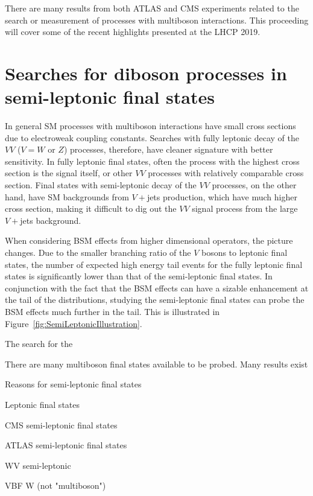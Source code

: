 \documentclass[10pt]{article}
\begin{document}
There are many results from both ATLAS and CMS experiments related to the search or measurement of processes with multiboson interactions.
This proceeding will cover some of the recent highlights presented at the LHCP 2019.

\section{Searches for diboson processes in semi-leptonic final states}

In general SM processes with multiboson interactions have small cross sections due to electroweak coupling constants.
Searches with fully leptonic decay of the $VV$ ($V=W$ or $Z$) processes, therefore, have cleaner signature with better sensitivity.
In fully leptonic final states, often the process with the highest cross section is the signal itself, or other $VV$ processes with relatively comparable cross section.
Final states with semi-leptonic decay of the $VV$ processes, on the other hand, have SM backgrounds from $V+$jets production, which have much higher cross section, making it difficult to dig out the $VV$ signal process from the large $V+$jets background.

When considering BSM effects from higher dimensional operators, the picture changes.
Due to the smaller branching ratio of the $V$ bosons to leptonic final states, the number of expected high energy tail events for the fully leptonic final states is significantly lower than that of the semi-leptonic final states.
In conjunction with the fact that the BSM effects can have a sizable enhancement at the tail of the distributions, studying the semi-leptonic final states can probe the BSM effects much further in the tail.
This is illustrated in Figure~\ref{fig:SemiLeptonicIllustration}.

The search for the 





There are many multiboson final states available to be probed.
Many results exist

Reasons for semi-leptonic final states

Leptonic final states

CMS semi-leptonic final states

ATLAS semi-leptonic final states

WV semi-leptonic

VBF W (not "multiboson")
\end{document}
